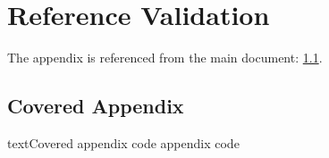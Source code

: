 \documentclass[a4paper,12pt]{report}
\begin{document}
\chapter{Reference Validation}
The appendix is referenced from the main document: \ref{appendix:covered}.
\appendixChapter
\section{Covered Appendix}\label{appendix:covered}
\begin{code}{text}{Covered appendix code}
appendix code
\end{code}
\end{document}
